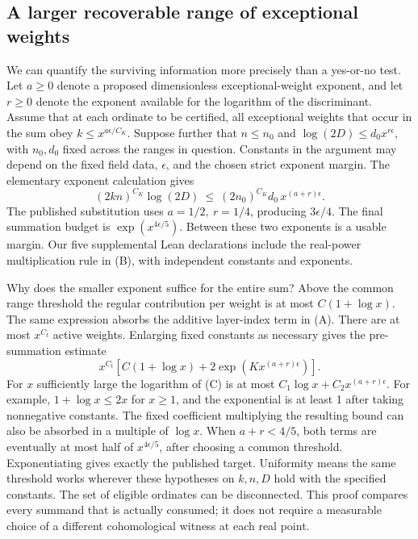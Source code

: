 \documentclass[12pt,letterpaper]{article}
\begin{document}
\subsection{A larger recoverable range of exceptional weights}
We can quantify the surviving information more precisely than a yes-or-no test. Let \(a\ge0\) denote a proposed dimensionless exceptional-weight exponent, and let \(r\ge0\) denote the exponent available for the logarithm of the discriminant. Assume that at each ordinate to be certified, all exceptional weights that occur in the sum obey \(k\le x^{a\epsilon/C_K}\). Suppose further that \(n\le n_0\) and \(\log(2D)\le d_0 x^{r\epsilon}\), with \(n_0,d_0\) fixed across the ranges in question. Constants in the argument may depend on the fixed field data, \(\epsilon\), and the chosen strict exponent margin. The elementary exponent calculation gives
\[
 (2kn)^{C_K}\log(2D)
 \ \le\ (2n_0)^{C_K}d_0\,x^{(a+r)\epsilon}.
 \tag{B}\label{eq:band-prod}
\]
The published substitution uses \(a=1/2,\ r=1/4\), producing \(3\epsilon/4\). The final summation budget is \(\exp(x^{4\epsilon/5})\). Between these two exponents is a usable margin. Our five supplemental Lean declarations include the real-power multiplication rule in (B), with independent constants and exponents.  

Why does the smaller exponent suffice for the entire sum? Above the common range threshold the regular contribution per weight is at most \(C(1+\log x)\). The same expression absorbs the additive layer-index term in (A). There are at most \(x^{C_t}\) active weights. Enlarging fixed constants as necessary gives the pre-summation estimate
\[
    x^{C_t}\left[C(1+\log x)+2\exp(Kx^{(a+r)\epsilon})\right].
 \tag{C}\label{eq:band-collector}
\]
For \(x\) sufficiently large the logarithm of (C) is at most \(C_1\log x+C_2x^{(a+r)\epsilon}\). For example, \(1+\log x\le 2x\) for \(x\ge1\), and the exponential is at least 1 after taking nonnegative constants. The fixed coefficient multiplying the resulting bound can also be absorbed in a multiple of \(\log x\). When \(a+r<4/5\), both terms are eventually at most half of \(x^{4\epsilon/5}\), after choosing a common threshold. Exponentiating gives exactly the published target. Uniformity means the same threshold works wherever these hypotheses on \(k,n,D\) hold with the specified constants. The set of eligible ordinates can be disconnected. This proof compares every summand that is actually consumed; it does not require a measurable choice of a different cohomological witness at each real point.  
\end{document}
